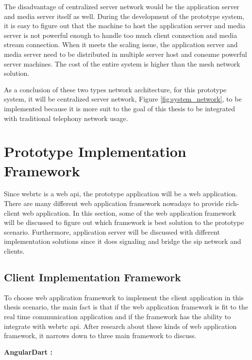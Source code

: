 \par The disadvantage of centralized server network would be the application server and media server itself as well. During the development of the prototype system, it is easy to figure out that the machine to host the application server and media server is not powerful enough to handle too much client connection and media stream connection. When it meets the scaling issue, the application server and media server need to be distributed in multiple server host and consume powerful server machines. The cost of the entire system is higher than the mesh network solution.

\par As a conclusion of these two types network architecture, for this prototype system, it will be centralized server network, Figure \ref{fig:system_network}, to be implemented because it is more suit to the goal of this thesis to be integrated with traditional telephony network usage.

\section{Prototype Implementation Framework}

\noindent Since \gls{webrtc} is a web \gls{api}, the prototype application will be a web application. There are many different web application framework nowadays to provide rich-client web application. In this section, some of the web application framework will be discussed to figure out which framework is best solution to the prototype scenario. Furthermore, application server will be discussed with different implementation solutions since it does signaling and bridge the \gls{sip} network and clients.

\subsection{Client Implementation Framework}

\noindent To choose web application framework to implement the client application in this thesis scenario, the main fact is that if the web  application framework is fit to the real time communication application and if the framework has the ability to integrate with \gls{webrtc} \gls{api}. After research about these kinds of web application framework, it narrows down to three main framework to discuss.

\textbf{AngularDart :}


